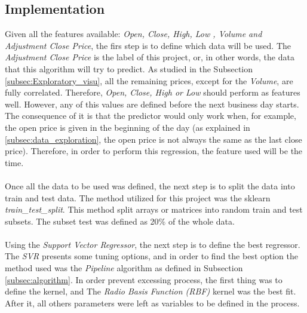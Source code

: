 \subsection{Implementation}
\label{subsec:implementation}
Given all the features available: \textit{Open, Close, High, Low , Volume and Adjustment Close Price}, the firs step is to define which data will be used. The \textit{Adjustment Close Price} is the label
of this project, or, in other words, the data that this algorithm will try to predict. As studied in the Subsection \ref{subsec:Exploratory_visu}, all the remaining prices, except for the \textit{Volume},
are fully correlated. Therefore, \textit{Open, Close, High or Low} should perform as features well. However, any of this values are defined before the next business day starts. The consequence of it is that
the predictor would only work when, for example, the open price is given in the beginning of the day (as explained in \ref{subsec:data_exploration}, the open price is not always the same as the last close price).
Therefore, in order to perform this regression, the feature used will be the time. \\ 
\\
Once all the data to be used was defined, the next step is to split the data into train and test data. The method utilized for this project was the sklearn \textit{train\_test\_split}. This method
split arrays or matrices into random train and test subsets. The subset test was defined as 20\% of the whole data.\\
\\
Using the \textit{Support Vector Regressor}, the next step is to define the best regressor. The \textit{SVR} presents some tuning options, and in order to find the best option the method used
was the \textit{Pipeline} algorithm as defined in Subsection \ref{subsec:algorithm}. In order prevent excessing process, the first thing was to define the kernel, and The \textit{Radio Basis Function (RBF)}
kernel was the best fit. After it, all others parameters were left as variables to be defined in the process.\\


